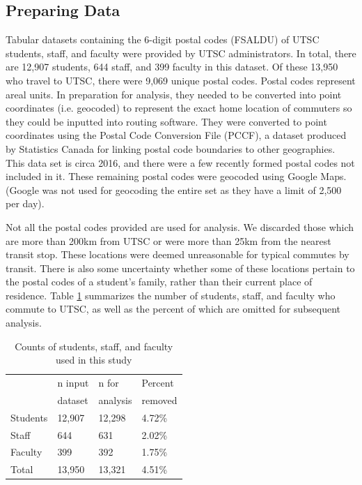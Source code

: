 \documentclass{article}
\begin{document}
	\subsection{Preparing Data}

		Tabular datasets containing the 6-digit postal codes (FSALDU) of UTSC students, staff, and faculty were provided by UTSC administrators. In total, there are 12,907 students, 644 staff, and 399 faculty in this dataset. Of these 13,950 who travel to UTSC, there were 9,069 unique postal codes. Postal codes represent areal units. In preparation for analysis, they needed to be converted into point coordinates (i.e. geocoded) to represent the exact home location of commuters so they could be inputted into routing software. They were converted to point coordinates using the Postal Code Conversion File (PCCF), a dataset produced by Statistics Canada for linking postal code boundaries to other geographies. This data set is circa 2016, and there were a few recently formed postal codes not included in it. These remaining postal codes were geocoded using Google Maps. (Google was not used for geocoding the entire set as they have a limit of 2,500 per day).

		Not all the postal codes provided are used for analysis. We discarded those which are more than 200km from UTSC or were more than 25km from the nearest transit stop. These locations were deemed unreasonable for typical commutes by transit. There is also some uncertainty whether some of these locations pertain to the postal codes of a student's family, rather than their current place of residence. Table \ref{ntable} summarizes the number of students, staff, and faculty who commute to UTSC, as well as the percent of which are omitted for subsequent analysis.

		\begin{table}[H]
			\centering
			\caption{Counts of students, staff, and faculty used in this study}
			\label{ntable}
			\begin{tabular}{l|lll}
	        & n input & n for & Percent \\ 
	        & dataset & analysis & removed \\ \hline
				Students & 12,907        & 12,298          & 4.72\%          \\
				Staff    & 644           & 631             & 2.02\%          \\
				Faculty  & 399           & 392             & 1.75\%          \\
				Total    & 13,950         & 13,321           & 4.51\%         
			\end{tabular}
		\end{table}
\end{document}
